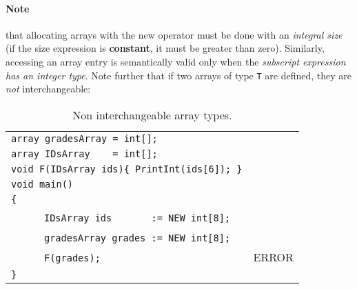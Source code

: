 \documentclass{article}
\begin{document}
\paragraph{Note} that allocating arrays with the new operator
must be done with an \textit{integral size} (if the size expression is \textbf{constant}, it must be greater than zero).
Similarly, accessing an array entry is semantically valid
only when the \textit{subscript expression has an integer type}.
Note further that if two arrays of type \verb"T" are defined,
they are \textit{not} interchangeable:
\begin{table}[h]
\centering
\begin{tabular}{ | l | l | }
\hline
\verb"array gradesArray = int[];"                 &       \\
\verb"array IDsArray    = int[];"                 &       \\
\verb"void F(IDsArray ids){ PrintInt(ids[6]); }" &       \\
\verb"void main()"                               &       \\
\verb"{"                                         &       \\
~ ~ ~ ~\verb"IDsArray ids       := NEW int[8];"  &       \\
~ ~ ~ ~\verb"gradesArray grades := NEW int[8];"  &       \\
~ ~ ~ ~\verb"F(grades);"                         & ERROR \\
\verb"}"                                         &       \\
\hline
\end{tabular}
\caption{Non interchangeable array types.
\label{Table_Code_Examples_nil_Instead_Of_Any_Array}}
\end{table}  
\end{document}
